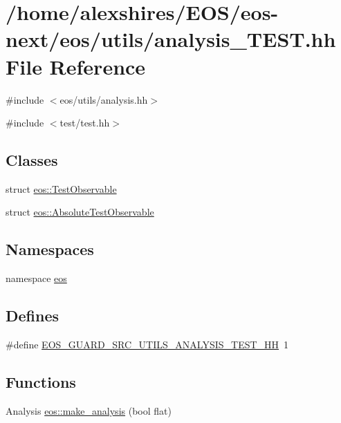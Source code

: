 \hypertarget{analysis__TEST_8hh}{
\section{/home/alexshires/EOS/eos-\/next/eos/utils/analysis\_\-TEST.hh File Reference}
\label{analysis__TEST_8hh}
}
{\ttfamily \#include $<$eos/utils/analysis.hh$>$}\par
{\ttfamily \#include $<$test/test.hh$>$}\par
\subsection*{Classes}
\begin{DoxyCompactItemize}
\item 
struct \hyperlink{structeos_1_1TestObservable}{eos::TestObservable}
\item 
struct \hyperlink{structeos_1_1AbsoluteTestObservable}{eos::AbsoluteTestObservable}
\end{DoxyCompactItemize}
\subsection*{Namespaces}
\begin{DoxyCompactItemize}
\item 
namespace \hyperlink{namespaceeos}{eos}
\end{DoxyCompactItemize}
\subsection*{Defines}
\begin{DoxyCompactItemize}
\item 
\#define \hyperlink{analysis__TEST_8hh_a4f33fcbf1e692400c9a9c29eb017cc79}{EOS\_\-GUARD\_\-SRC\_\-UTILS\_\-ANALYSIS\_\-TEST\_\-HH}~1
\end{DoxyCompactItemize}
\subsection*{Functions}
\begin{DoxyCompactItemize}
\item 
Analysis \hyperlink{namespaceeos_ae42e0cf8b4c1c3548fc27a5add336258}{eos::make\_\-analysis} (bool flat)
\end{DoxyCompactItemize}


